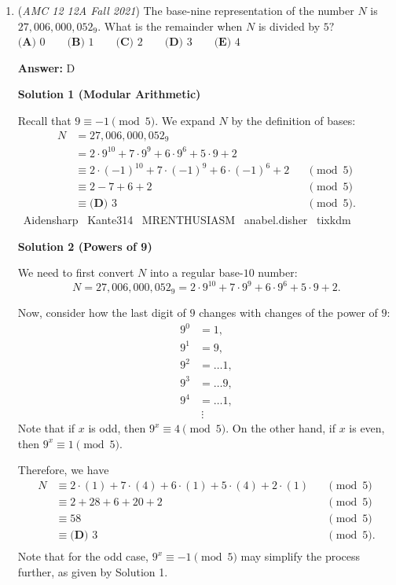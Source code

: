 \begin{enumerate}
 


	\item (\textit{AMC 12 12A Fall 2021}) The base-nine representation of the number $N$ is $27{,}006{,}000{,}052_{\text{9}}.$ What is the remainder when $N$ is divided by $5?$
$\textbf{(A) } 0\qquad\textbf{(B) } 1\qquad\textbf{(C) } 2\qquad\textbf{(D) } 3\qquad\textbf{(E) }4$

 \textbf{Answer: }D



\textbf{Solution 1 (Modular Arithmetic)}

Recall that $9\equiv-1\pmod{5}.$ We expand $N$ by the definition of bases:
 \begin{align*} N&=27{,}006{,}000{,}052_9 \\ &= 2\cdot9^{10} + 7\cdot9^9 + 6\cdot9^6 + 5\cdot9 + 2 \\ &\equiv 2\cdot(-1)^{10} + 7\cdot(-1)^9 + 6\cdot(-1)^6 + 2 &&\pmod{5} \\ &\equiv 2-7+6+2 &&\pmod{5} \\ &\equiv \boxed{\textbf{(D) } 3} &&\pmod{5}. \end{align*}
~Aidensharp ~Kante314 ~MRENTHUSIASM ~anabel.disher ~tixkdm

 



\textbf{Solution 2 (Powers of 9)}

We need to first convert $N$ into a regular base-$10$ number: 
 \[N = 27{,}006{,}000{,}052_9 = 2\cdot9^{10} + 7\cdot9^9 + 6\cdot9^6 + 5\cdot9 + 2.\]

 Now, consider how the last digit of $9$ changes with changes of the power of $9:$
 \begin{align*} 9^0&=1, \\ 9^1&=9, \\ 9^2&=\ldots 1, \\ 9^3&=\ldots 9, \\ 9^4&=\ldots 1, \\ & \ \vdots \end{align*}
Note that if $x$ is odd, then $9^x \equiv 4\pmod{5}.$ On the other hand, if $x$ is even, then $9^x \equiv 1\pmod{5}.$

 Therefore, we have
 \begin{align*} N&\equiv 2\cdot(1) + 7\cdot(4) + 6\cdot(1) + 5\cdot(4) + 2\cdot(1) &&\pmod{5} \\ &\equiv 2+28+6+20+2 &&\pmod{5} \\ &\equiv 58 &&\pmod{5} \\ &\equiv \boxed{\textbf{(D) } 3} &&\pmod{5}. \\ \end{align*}
Note that for the odd case, $9^x \equiv -1\pmod{5}$ may simplify the process further, as given by Solution 1.


\end{enumerate}
